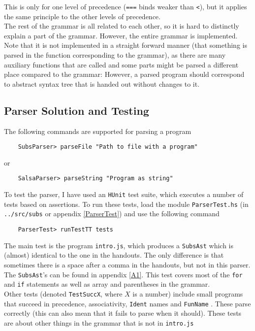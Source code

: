 \documentclass[a4paper]{article}
\begin{document}
This is only for one level of precedence (\texttt{===} binds weaker than \texttt{<}), but it applies the same principle to the other levels of precedence. \\
The rest of the grammar is all related to each other, so it is hard to distinctly explain a part of the grammar. However, the entire grammar is implemented. Note that it is not implemented in a straight forward manner (that something is parsed in the function corresponding to the grammar), as there are many auxiliary functions that are called and some parts might be parsed a different place compared to the grammar: However, a parsed program should correspond to abstract syntax tree that is handed out without changes to it.

\subsection{Parser Solution and Testing}
The following commands are supported for parsing a program
\begin{verbatim}
    SubsParser> parseFile "Path to file with a program"
\end{verbatim}
or
\begin{verbatim}
    SalsaParser> parseString "Program as string"
\end{verbatim}
To test the parser, I have used an \texttt{HUnit} test suite, which executes a number of tests based on assertions. To run these tests, load the module \texttt{ParserTest.hs} (in \texttt{../src/subs} or appendix \ref{ParserTest}) and use the following command
\begin{verbatim}
    ParserTest> runTestTT tests
\end{verbatim}
The main test is the program \texttt{intro.js}, which produces a \texttt{SubsAst} which is (almost) identical to the one in the handouts. The only difference is that sometimes there is a space after a comma in the handouts, but not in this parser. The \texttt{SubsAst}'s can be found in appendix \ref{A1}. This test covers most of the \texttt{for} and \texttt{if} statements as well as array and parentheses in the grammar. \\
Other tests (denoted \texttt{TestSuccX}, where $X$ is a number) include small programs that succeed in precedence, associativity, \texttt{Ident} names and \texttt{FunName} . These parse correctly (this can also mean that it fails to parse when it should). These tests are about other things in the grammar that is not in \texttt{intro.js}
\end{document}
